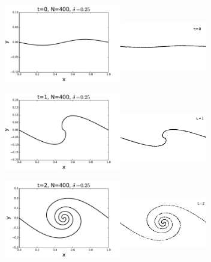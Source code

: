 \documentclass[12pt,twoside]{article}
\begin{document}
\begin{figure}
\begin{center}
	\includegraphics[width=2in,height=1.33in]{K6.pdf}\includegraphics[width=1.5in,height=1.2in]{periodic1.png}

	\includegraphics[width=2in,height=1.33in]{K7.pdf}\includegraphics[width=1.5in,height=1.1in]{periodic21.png}

	\includegraphics[width=2in,height=1.33in]{K8.pdf}\includegraphics[width=1.5in,height=1.2in]{periodic22.png}


\end{center}
\end{figure}
\end{document}
